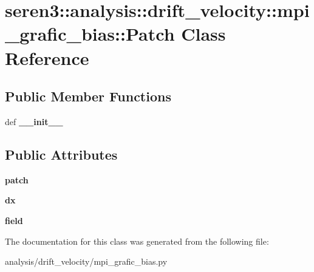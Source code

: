 \hypertarget{classseren3_1_1analysis_1_1drift__velocity_1_1mpi__grafic__bias_1_1Patch}{
\section{seren3::analysis::drift\_\-velocity::mpi\_\-grafic\_\-bias::Patch Class Reference}
\label{classseren3_1_1analysis_1_1drift__velocity_1_1mpi__grafic__bias_1_1Patch}
}
\subsection*{Public Member Functions}
\begin{DoxyCompactItemize}
\item 
\hypertarget{classseren3_1_1analysis_1_1drift__velocity_1_1mpi__grafic__bias_1_1Patch_a590c0f53684cd1e3dc3da74cb01516d3}{
def {\bfseries \_\-\_\-init\_\-\_\-}}
\label{classseren3_1_1analysis_1_1drift__velocity_1_1mpi__grafic__bias_1_1Patch_a590c0f53684cd1e3dc3da74cb01516d3}

\end{DoxyCompactItemize}
\subsection*{Public Attributes}
\begin{DoxyCompactItemize}
\item 
\hypertarget{classseren3_1_1analysis_1_1drift__velocity_1_1mpi__grafic__bias_1_1Patch_ad9fb9bf5b0c619d6bf2f16ddaceb074e}{
{\bfseries patch}}
\label{classseren3_1_1analysis_1_1drift__velocity_1_1mpi__grafic__bias_1_1Patch_ad9fb9bf5b0c619d6bf2f16ddaceb074e}

\item 
\hypertarget{classseren3_1_1analysis_1_1drift__velocity_1_1mpi__grafic__bias_1_1Patch_a330612414443f2e68b9480ee4e6309c8}{
{\bfseries dx}}
\label{classseren3_1_1analysis_1_1drift__velocity_1_1mpi__grafic__bias_1_1Patch_a330612414443f2e68b9480ee4e6309c8}

\item 
\hypertarget{classseren3_1_1analysis_1_1drift__velocity_1_1mpi__grafic__bias_1_1Patch_ac57c0f756ab01a470b8f5002a94e0875}{
{\bfseries field}}
\label{classseren3_1_1analysis_1_1drift__velocity_1_1mpi__grafic__bias_1_1Patch_ac57c0f756ab01a470b8f5002a94e0875}

\end{DoxyCompactItemize}


The documentation for this class was generated from the following file:\begin{DoxyCompactItemize}
\item 
analysis/drift\_\-velocity/mpi\_\-grafic\_\-bias.py\end{DoxyCompactItemize}
